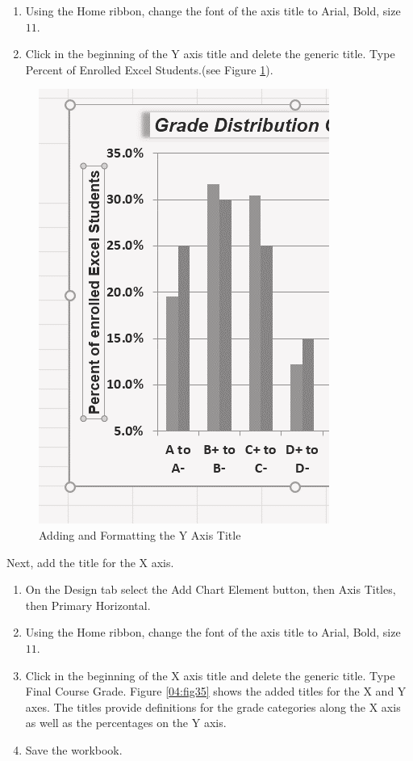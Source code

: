 \begin{enumerate}
	\item Using the Home ribbon, change the font of the axis title to Arial, Bold, size $ 11 $.
	\item Click in the beginning of the Y axis title and delete the generic title. Type Percent of Enrolled Excel Students.(see Figure \ref{04:fig34}).
\end{enumerate}

\begin{figure}[H]
	\centering
	\includegraphics[width=\maxwidth{.95\linewidth}]{gfx/ch04_fig34}
	\caption{Adding and Formatting the Y Axis Title}
	\label{04:fig34}
\end{figure}

Next, add the title for the X axis.

\begin{enumerate}
	\item On the Design tab select the Add Chart Element button, then Axis Titles, then Primary Horizontal.
	\item Using the Home ribbon, change the font of the axis title to Arial, Bold, size $ 11 $. 
	\item Click in the beginning of the X axis title and delete the generic title. Type Final Course Grade. Figure \ref{04:fig35} shows the added titles for the X and Y axes. The titles provide definitions for the grade categories along the X axis as well as the percentages on the Y axis.
	\item Save the workbook.
\end{enumerate}

